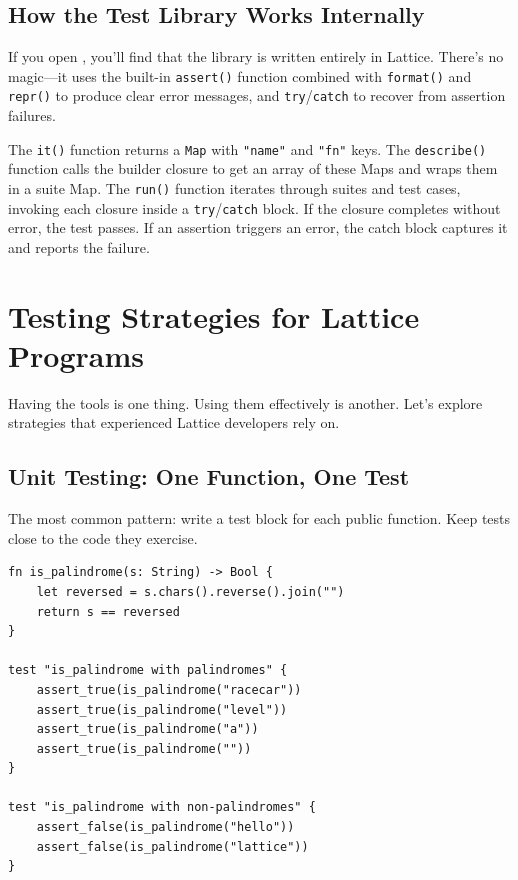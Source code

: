 \subsection{How the Test Library Works Internally}\label{sec:test-lib-internals}

If you open , you'll find that the library is written entirely in Lattice.
There's no magic---it uses the built-in \lstinline|assert()| function combined with \lstinline|format()| and \lstinline|repr()| to produce clear error messages, and \lstinline|try|/\lstinline|catch| to recover from assertion failures.

The \lstinline|it()| function returns a \lstinline|Map| with \lstinline|"name"| and \lstinline|"fn"| keys.
The \lstinline|describe()| function calls the builder closure to get an array of these Maps and wraps them in a suite Map.
The \lstinline|run()| function iterates through suites and test cases, invoking each closure inside a \lstinline|try|/\lstinline|catch| block.
If the closure completes without error, the test passes.
If an assertion triggers an error, the catch block captures it and reports the failure.

\section{Testing Strategies for Lattice Programs}\label{sec:testing-strategies}

Having the tools is one thing.
Using them effectively is another.
Let's explore strategies that experienced Lattice developers rely on.

\subsection{Unit Testing: One Function, One Test}\label{sec:unit-testing}

The most common pattern: write a test block for each public function.
Keep tests close to the code they exercise.

\begin{lstlisting}[language=Lattice, caption={Unit tests alongside the code}]
fn is_palindrome(s: String) -> Bool {
    let reversed = s.chars().reverse().join("")
    return s == reversed
}

test "is_palindrome with palindromes" {
    assert_true(is_palindrome("racecar"))
    assert_true(is_palindrome("level"))
    assert_true(is_palindrome("a"))
    assert_true(is_palindrome(""))
}

test "is_palindrome with non-palindromes" {
    assert_false(is_palindrome("hello"))
    assert_false(is_palindrome("lattice"))
}
\end{lstlisting}

